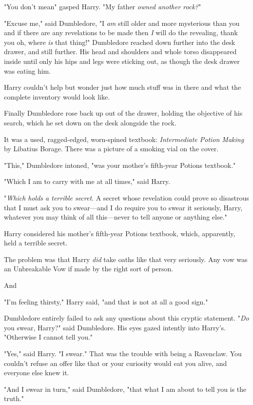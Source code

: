 "You don't mean{\el}" gasped Harry. "My father{\el} \emph{owned another
rock?}"

"Excuse me," said Dumbledore, "I \emph{am} still older and more mysterious than
you and if there are any revelations to be made then \emph{I} will do the
revealing, thank you{\el} oh, where \emph{is} that thing!" Dumbledore
reached down further into the desk drawer, and still further. His head and
shoulders and whole torso disappeared inside until only his hips and legs were
sticking out, as though the desk drawer was eating him.

Harry couldn't help but wonder just how much stuff was in there and what the
complete inventory would look like.

Finally Dumbledore rose back up out of the drawer, holding the objective of his
search, which he set down on the desk alongside the rock.

It was a used, ragged-edged, worn-spined textbook: \emph{Intermediate Potion
Making} by Libatius Borage. There was a picture of a smoking vial on the cover.

"This," Dumbledore intoned, "was your mother's fifth-year Potions textbook."

"Which I am to carry with me at all times," said Harry.

"\emph{Which holds a terrible secret}. A secret whose revelation could prove so
disastrous that I must ask you to swear---and I do require you to swear it
seriously, Harry, whatever you may think of all this---never to tell anyone or
anything else."

Harry considered his mother's fifth-year Potions textbook, which, apparently,
held a terrible secret.

The problem was that Harry \emph{did} take oaths like that very seriously.
Any vow was an Unbreakable Vow if made by the right sort of person.

And{\el}

"I'm feeling thirsty," Harry said, "and that is not at all a good sign."

Dumbledore entirely failed to ask any questions about this cryptic statement.
"\emph{Do} you swear, Harry?" said Dumbledore. His eyes gazed intently into
Harry's. "Otherwise I cannot tell you."

"Yes," said Harry. "I swear." That was the trouble with being a Ravenclaw. You
couldn't refuse an offer like that or your curiosity would eat you alive, and
everyone else knew it.

"And I swear in turn," said Dumbledore, "that what I am about to tell you is
the truth."

